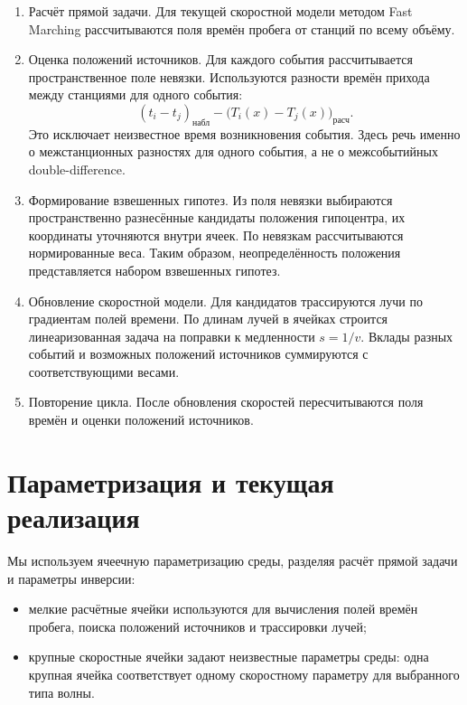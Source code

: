 \documentclass[12pt,a4paper]{article}
\begin{document}
\begin{enumerate}
    \item Расчёт прямой задачи.
    Для текущей скоростной модели методом Fast Marching рассчитываются
    поля времён пробега от станций по всему объёму.

    \item Оценка положений источников.
    Для каждого события рассчитывается пространственное поле невязки.
    Используются разности времён прихода между станциями для одного
    события:
    \[
        (t_i-t_j)_{\text{набл}}
        -
        \bigl(T_i(x)-T_j(x)\bigr)_{\text{расч}}.
    \]
    Это исключает неизвестное время возникновения события. Здесь речь
    именно о межстанционных разностях для одного события, а не
    о межсобытийных double-difference.

    \item Формирование взвешенных гипотез.
    Из поля невязки выбираются пространственно разнесённые кандидаты
    положения гипоцентра, их координаты уточняются внутри ячеек.
    По невязкам рассчитываются нормированные веса. Таким образом,
    неопределённость положения представляется набором взвешенных гипотез.

    \item Обновление скоростной модели.
    Для кандидатов трассируются лучи по градиентам полей времени.
    По длинам лучей в ячейках строится линеаризованная задача на поправки
    к медленности \(s=1/v\). Вклады разных событий и возможных положений
    источников суммируются с соответствующими весами.

    \item Повторение цикла.
    После обновления скоростей пересчитываются поля времён и оценки
    положений источников.
\end{enumerate}

\section*{Параметризация и текущая реализация}

Мы используем ячеечную параметризацию среды, разделяя
расчёт прямой задачи и параметры инверсии:

\begin{itemize}
    \item мелкие расчётные ячейки используются для вычисления
    полей времён пробега, поиска положений источников и трассировки лучей;
    \item крупные скоростные ячейки задают неизвестные параметры
    среды: одна крупная ячейка соответствует одному скоростному
    параметру для выбранного типа волны.
\end{itemize}
\end{document}
